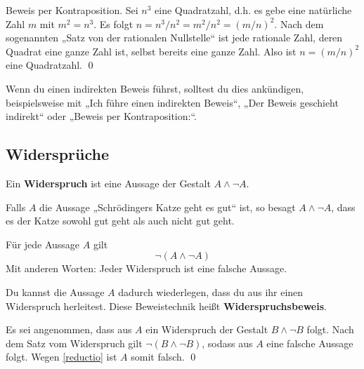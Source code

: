 \begin{bew}
    Beweis per Kontraposition. Sei $n^3$ eine Quadratzahl, d.h. es gebe eine natürliche Zahl $m$ mit $m^2=n^3$. Es folgt $n=n^3/n^2=m^2/n^2 = (m/n)^2$. Nach dem sogenannten „Satz von der rationalen Nullstelle“ ist jede rationale Zahl, deren Quadrat eine ganze Zahl ist, selbst bereits eine ganze Zahl. Also ist $n=(m/n)^2$ eine Quadratzahl. \qed
\end{bew}
  
  
\begin{bem}
    Wenn du einen indirekten Beweis führst, solltest du dies ankündigen, beispielsweise mit „Ich führe einen indirekten Beweis“, „Der Beweis geschieht indirekt“ oder „Beweis per Kontraposition:“.
\end{bem}





\subsection*{Widersprüche}


\begin{defin} 
    Ein \textbf{Widerspruch} ist eine Aussage der Gestalt $A\land \neg A$.
\end{defin}


\begin{bsp}
    Falls $A$ die Aussage „Schrödingers Katze geht es gut“ ist, so besagt $A\land \neg A$, dass es der Katze sowohl gut geht als auch nicht gut geht.
\end{bsp}


\begin{axiom} 
    Für jede Aussage $A$ gilt
        \[ \neg(A\land \neg A) \]
    Mit anderen Worten: Jeder Widerspruch ist eine falsche Aussage.
\end{axiom}


\begin{satz} \label{widerspruchsbeweis} 
    Du kannst die Aussage $A$ dadurch wiederlegen, dass du aus ihr einen Widerspruch herleitest. Diese Beweistechnik heißt \textbf{Widerspruchsbeweis}.
\end{satz}


\begin{bew}
    Es sei angenommen, dass aus $A$ ein Widerspruch der Gestalt $B\land \neg B$ folgt. Nach dem Satz vom Widerspruch gilt $\neg (B\land \neg B)$, sodass aus $A$ eine falsche Aussage folgt. Wegen \cref{reductio} ist $A$ somit falsch. \qed
\end{bew}

